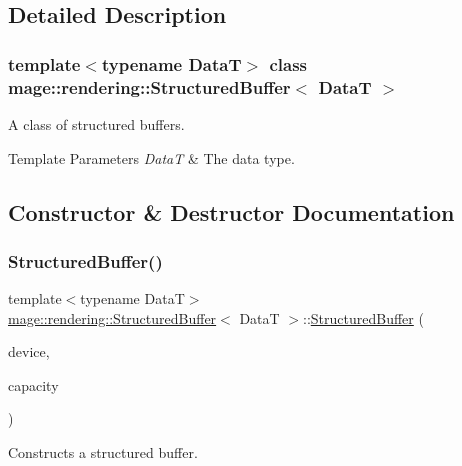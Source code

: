 \subsection{Detailed Description}
\subsubsection*{template$<$typename DataT$>$\newline
class mage\+::rendering\+::\+Structured\+Buffer$<$ Data\+T $>$}

A class of structured buffers.


\begin{DoxyTemplParams}{Template Parameters}
{\em DataT} & The data type. \\
\hline
\end{DoxyTemplParams}


\subsection{Constructor \& Destructor Documentation}
\hypertarget{classmage_1_1rendering_1_1_structured_buffer_a7a12044b41fccd5c3a9c6d600ae8fd14}{}\label{classmage_1_1rendering_1_1_structured_buffer_a7a12044b41fccd5c3a9c6d600ae8fd14} 
\subsubsection{\texorpdfstring{Structured\+Buffer()}{StructuredBuffer()}\hspace{0.1cm}{\footnotesize\ttfamily [1/3]}}
{\footnotesize\ttfamily template$<$typename DataT$>$ \\
\hyperlink{classmage_1_1rendering_1_1_structured_buffer}{mage\+::rendering\+::\+Structured\+Buffer}$<$ DataT $>$\+::\hyperlink{classmage_1_1rendering_1_1_structured_buffer}{Structured\+Buffer} (\begin{DoxyParamCaption}\item[{I\+D3\+D11\+Device \&}]{device,  }\item[{size\+\_\+t}]{capacity }\end{DoxyParamCaption})\hspace{0.3cm}{\ttfamily [explicit]}}

Constructs a structured buffer.


